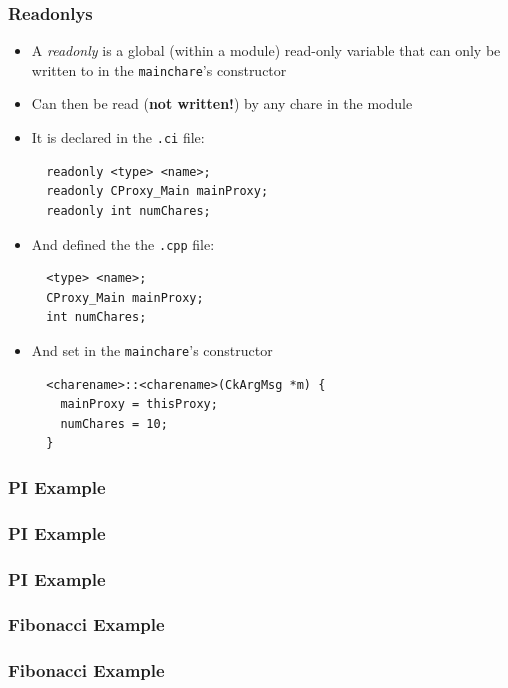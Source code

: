 \begin{frame}[fragile]
  \frametitle{Readonlys}
  \begin{itemize}
  \item A \textit{readonly} is a global (within a module) read-only variable
    that can only be written to in the \texttt{mainchare}'s constructor
  \item Can then be read (\textbf{not written!}) by any chare in the module
  \item It is declared in the \texttt{.ci} file:
\begin{lstlisting}
  readonly <type> <name>;
  readonly CProxy_Main mainProxy;
  readonly int numChares;
\end{lstlisting}
  \item And defined the the \texttt{.cpp} file:
\begin{lstlisting}
  <type> <name>;
  CProxy_Main mainProxy;
  int numChares;
\end{lstlisting}
  \item And set in the \texttt{mainchare}'s constructor
\begin{lstlisting}
  <charename>::<charename>(CkArgMsg *m) {
    mainProxy = thisProxy;
    numChares = 10;
  }
\end{lstlisting}


  \end{itemize}
\end{frame}

\begin{frame}[fragile]
  \frametitle{PI Example}
    
\end{frame}

\begin{frame}[fragile]
  \frametitle{PI Example}
  
\end{frame}

\begin{frame}[fragile]
  \frametitle{PI Example}
  
\end{frame}

\begin{frame}[fragile]
  \frametitle{Fibonacci Example}
  
\end{frame}

\begin{frame}[fragile]
  \frametitle{Fibonacci Example}
  
\end{frame}
